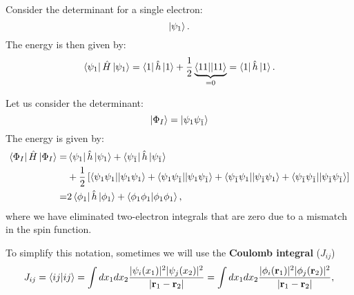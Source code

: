 \documentclass[../Main/chem532-notes.tex]{subfiles}
\begin{document}
\begin{example}
Consider the determinant for a single electron:
\begin{equation}
\ket{\psi_1}.
\end{equation}
The energy is then given by:
\begin{equation}
\bra{\psi_1} \hat{H} \ket{\psi_1} = \bra{1} \hat{h} \ket{1} + \frac{1}{2} \underbrace{\bra{11}\!\ket{11}}_{=0} = \bra{1}\hat{h}\ket{1}.
\end{equation}
\end{example}

\begin{example}
Let us consider the determinant:
\begin{equation}
\ket{\Phi_I} = \ket{\psi_1 \psi_{\bar{1}}}
\end{equation}
The energy is given by:
\begin{equation}
\begin{split}
\bra{\Phi_I} \hat{H} \ket{\Phi_I} =& \bra{\psi_1}\hat{h}\ket{\psi_1} + \bra{\psi_{\bar{1}}} \hat{h} \ket{\psi_{\bar{1}}}\\ 
&+ \frac{1}{2} \left[ 
\bra{\psi_1 \psi_1}\!\ket{\psi_1 \psi_1}
+ \bra{\psi_1\psi_{\bar{1}}}\!\ket{\psi_1\psi_{\bar{1}}} 
+ \bra{\psi_{\bar{1}}\psi_1}\!\ket{\psi_{\bar{1}}\psi_1} + \bra{\psi_{\bar{1}}\psi_{\bar{1}}}\!\ket{ \psi_{\bar{1}}\psi_{\bar{1}}}\right] \\
=& 2 \bra{\phi_1}\hat{h}\ket{\phi_1} + \braket{\phi_1 \phi_1| \phi_1 \phi_1},
\end{split}
\end{equation}
where we have eliminated two-electron integrals that are zero due to a mismatch in the spin function.
\end{example}

To simplify this notation, sometimes we will use the \textbf{Coulomb integral} ($J_{ij}$)
\begin{equation}
J_{ij} =\braket{ij|ij} = 
\int dx_1 dx_2 \frac{|\psi_{i}(x_1)|^2 |\psi_{j}(x_2)|^2 }{|\mathbf{r}_1 - \mathbf{r}_2|}
= \int dx_1 dx_2 \frac{|\phi_{i}(\mathbf{r}_1)|^2 |\phi_{j}(\mathbf{r}_2)|^2 }{|\mathbf{r}_1 - \mathbf{r}_2|},
\end{equation}
\end{document}
